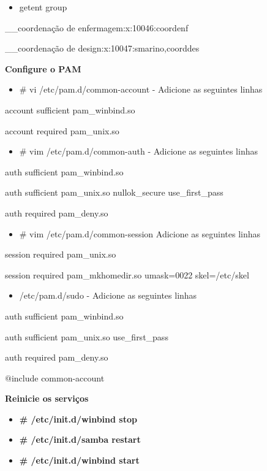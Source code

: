 \begin{itemize}
	\item {getent group}
\end{itemize}

\_\_coordenação de enfermagem:x:10046:coordenf

\_\_coordenação de design:x:10047:smarino,coorddes

\textbf{Configure o PAM}

\begin{itemize}
	\item {\# vi /etc/pam.d/common-account} - Adicione as seguintes linhas
\end{itemize}

account sufficient       pam\_winbind.so

account required         pam\_unix.so

\begin{itemize}
	\item {\# vim /etc/pam.d/common-auth} - Adicione as seguintes linhas
\end{itemize}

auth sufficient pam\_winbind.so

auth sufficient pam\_unix.so nullok\_secure use\_first\_pass

auth required   pam\_deny.so

\begin{itemize}
	\item {\# vim /etc/pam.d/common-session} Adicione as seguintes linhas
\end{itemize}

session required pam\_unix.so

session required pam\_mkhomedir.so umask=0022 skel=/etc/skel

\begin{itemize}
	\item {/etc/pam.d/sudo} - Adicione as seguintes linhas
\end{itemize}

auth sufficient pam\_winbind.so

auth sufficient pam\_unix.so use\_first\_pass

auth required   pam\_deny.so

$@$include common-account



\textbf{Reinicie os serviços}

\begin{itemize}
	\item \textbf{\# /etc/init.d/winbind stop}
	\item \textbf{\# /etc/init.d/samba restart}
	\item \textbf{\# /etc/init.d/winbind start}
\end{itemize}

